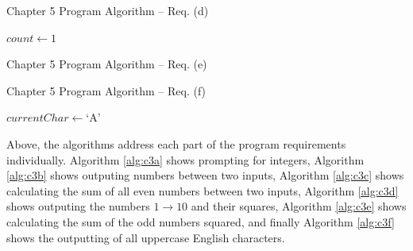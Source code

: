 \documentclass[a4paper, 11pt]{article}
\begin{document}
    \newpage
    \begin{algorithm}[H]
      \caption{Chapter 5 Program Algorithm -- Req. (d)}
      \vspace{12pt}
      \begin{algorithmic}[1]
          \State $count\gets 1$
          \State
            \State{}
            \State{}
          \EndWhile
        \EndProcedure\label{first10endproc}
      \end{algorithmic}
      \label{alg:c3d}
    \end{algorithm}
    \begin{algorithm}[H]
      \caption{Chapter 5 Program Algorithm -- Req. (e)}
      \vspace{12pt}
      \begin{algorithmic}[1]
        \EndProcedure\label{sumoddsqendproc}
      \end{algorithmic}
      \label{alg:c3e}
    \end{algorithm}
    \begin{algorithm}[H]
      \caption{Chapter 5 Program Algorithm -- Req. (f)}
      \vspace{12pt}
      \begin{algorithmic}[1]
          \State $currentChar\gets \text{`A'}$
          \State
            \State{}
          \EndWhile
        \EndProcedure\label{uppercaseendproc}
      \end{algorithmic}
      \label{alg:c3f}
    \end{algorithm}

    Above, the algorithms address each part of the program requirements
      individually. Algorithm \ref{alg:c3a} shows prompting for integers,
      Algorithm \ref{alg:c3b} shows outputing numbers between two inputs,
      Algorithm \ref{alg:c3c} shows calculating the sum of all even numbers
      between two inputs, Algorithm \ref{alg:c3d} shows outputing the numbers
      $1\rightarrow10$ and their squares, Algorithm \ref{alg:c3e} shows
      calculating the sum of the odd numbers squared, and finally Algorithm
      \ref{alg:c3f} shows the outputting of all uppercase English characters.
\end{document}
